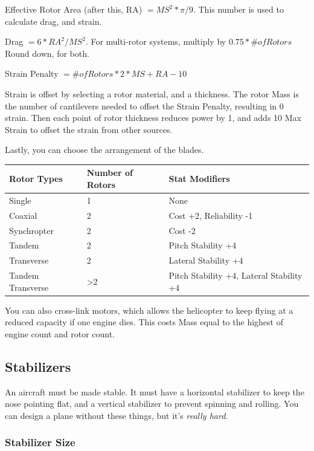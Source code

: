 \documentclass{article}
\begin{document}
Effective Rotor Area (after this, RA) $= MS^2 * \pi / 9$. This number is used to calculate drag, and strain.

Drag $= 6 * RA^2 / MS^2$.  For multi-rotor systems, multiply by $0.75 * \# of Rotors$ Round down, for both.

Strain Penalty $= \# of Rotors * 2 * MS + RA - 10$

Strain is offset by selecting a rotor material, and a thickness.  The rotor Mass is the number of cantilevers needed to offset the Strain Penalty, resulting in 0 strain. Then each point of rotor thickness reduces power by 1, and adds 10 Max Strain to offset the strain from other sources.

Lastly, you can choose the arrangement of the blades.

\begin{tabular}{|l|l|l|}
    \hline
    Rotor Types & Number of Rotors & Stat Modifiers                                          \\\hline
    Single & 1 & None \\\hline
    Coaxial   & 2 & Cost +2, Reliability -1     \\\hline
    Synchropter & 2 & Cost -2 \\\hline
    Tandem & 2 & Pitch Stability +4  \\\hline
    Transverse & 2 & Lateral Stability +4 \\\hline
    Tandem Transverse & >2 & Pitch Stability +4, Lateral Stability +4
\end{tabular}

You can also cross-link motors, which allows the helicopter to keep flying at a reduced capacity if one engine dies.  This costs Mass equal to the highest of engine count and rotor count.

\subsection{Stabilizers}
\label{_Stabilizers}

An aircraft must be made stable. It must have a horizontal stabilizer to
keep the nose pointing flat, and a vertical stabilizer to prevent
spinning and rolling. You can design a plane without these things, but
it's \emph{really hard}.

\subsubsection{Stabilizer Size}
\label{_Stabilizer Size}
\end{document}
